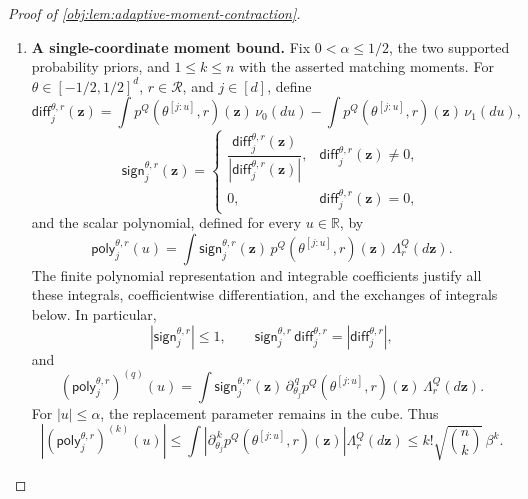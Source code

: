 \documentclass[11pt]{article}
\begin{document}
\begin{proof}[Proof of \cref{obj:lem:adaptive-moment-contraction}]
\begin{enumerate}
\item \textbf{A single-coordinate moment bound.}
Fix \(0<\alpha\le1/2\), the two supported probability priors, and
\(1\le k\le n\) with the asserted matching moments. For
\(\theta\in[-1/2,1/2]^d\), \(r\in\mathcal R\), and \(j\in[d]\), define
\[
\mathsf{diff}^{\theta,r}_j(\mathbf z)
=
\int p^Q(\theta^{[j:u]},r)(\mathbf z)\,\nu_0(du)
-\int p^Q(\theta^{[j:u]},r)(\mathbf z)\,\nu_1(du),
\]
\[
\mathsf{sign}^{\theta,r}_j(\mathbf z)
=
\begin{cases}
\dfrac{\mathsf{diff}^{\theta,r}_j(\mathbf z)}
      {|\mathsf{diff}^{\theta,r}_j(\mathbf z)|},
 &\mathsf{diff}^{\theta,r}_j(\mathbf z)\ne0,\\[6pt]
0,&\mathsf{diff}^{\theta,r}_j(\mathbf z)=0,
\end{cases}
\]
and the scalar polynomial, defined for every \(u\in\mathbb R\), by
\[
\mathsf{poly}^{\theta,r}_j(u)
=
\int
 \mathsf{sign}^{\theta,r}_j(\mathbf z)\,
 p^Q(\theta^{[j:u]},r)(\mathbf z)\,
 \Lambda_r^Q(d\mathbf z).
\]
The finite polynomial representation and integrable coefficients justify all these integrals, coefficientwise differentiation, and the exchanges of integrals below. In particular,
\[
|\mathsf{sign}^{\theta,r}_j|\le1,
\qquad
\mathsf{sign}^{\theta,r}_j\,\mathsf{diff}^{\theta,r}_j
=|\mathsf{diff}^{\theta,r}_j|,
\]
and
\[
\left(\mathsf{poly}^{\theta,r}_j\right)^{(q)}(u)
=
\int
 \mathsf{sign}^{\theta,r}_j(\mathbf z)\,
 \partial_{\theta_j}^{\,q}p^Q(\theta^{[j:u]},r)(\mathbf z)\,
 \Lambda_r^Q(d\mathbf z).
\]
For \(|u|\le\alpha\), the replacement parameter remains in the cube. Thus
\[
\left|
 \left(\mathsf{poly}^{\theta,r}_j\right)^{(k)}(u)
\right|
\le
\int
 \left|\partial_{\theta_j}^{\,k}
 p^Q(\theta^{[j:u]},r)(\mathbf z)\right|
 \Lambda_r^Q(d\mathbf z)
\le k!\sqrt{\binom nk}\,\beta^k.
\]


\end{enumerate}
\end{proof}
\end{document}
